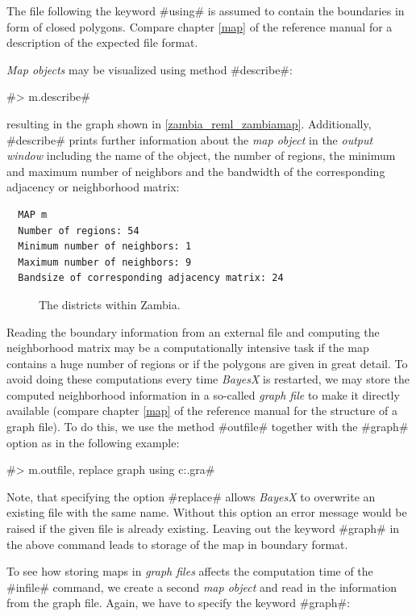 \documentclass[11pt,a4paper,twoside]{bayesxreport}
\begin{document}
The file following the keyword #using# is assumed to contain the
boundaries in form of closed polygons. Compare chapter \ref*{map} of
the reference manual for a description of the expected file format.

{\it Map objects} may be visualized using method #describe#:

#> m.describe#

resulting in the graph shown in \autoref{zambia_reml_zambiamap}.
Additionally, #describe# prints further information about the {\it
map object} in the {\it output window} including the name of the
object, the number of regions, the minimum and maximum number of
neighbors and the bandwidth of the corresponding adjacency or
neighborhood matrix:

\begin{verbatim}
  MAP m
  Number of regions: 54
  Minimum number of neighbors: 1
  Maximum number of neighbors: 9
  Bandsize of corresponding adjacency matrix: 24
\end{verbatim}

\begin{figure}[ht]
\begin{center}
 {\it\caption{The
districts within Zambia.\label{zambia_reml_zambiamap}}}
\end{center}
\end{figure}

Reading the boundary information from an external file and computing
the neighborhood matrix may be a computationally intensive task if
the map contains a huge number of regions or if the polygons are
given in great detail. To avoid doing these computations every time
{\em BayesX} is restarted, we may store the computed neighborhood
information in a so-called {\it graph file} to make it directly
available (compare chapter \ref*{map} of the reference manual for
the structure of a graph file). To do this, we use the method
#outfile# together with the #graph# option as in the following
example:

#> m.outfile, replace graph using c:\data\zambia.gra#

Note, that specifying the option #replace# allows {\it BayesX} to
overwrite an existing file with the same name. Without this option
an error message would be raised if the given file is already
existing. Leaving out the keyword #graph# in the above command leads
to storage of the map in boundary format.

To see how storing maps in {\it graph files} affects the computation
time of the #infile# command, we create a second {\it map object}
and read in the information from the graph file. Again, we have to
specify the keyword #graph#:
\end{document}

